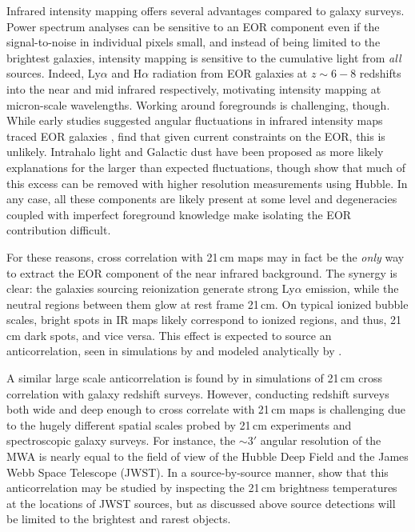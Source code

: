 \documentclass[numberedappendix]{emulateapj}
\begin{document}
Infrared intensity mapping offers several advantages compared to galaxy surveys. Power spectrum analyses can be sensitive to an EOR component even if the signal-to-noise in individual pixels small, and instead of being limited to the brightest galaxies, intensity mapping is sensitive to the cumulative light from \textit{all} sources. Indeed, Ly$\alpha$ and H$\alpha$ radiation from EOR galaxies at $z\sim6-8$ redshifts into the near and mid infrared respectively, motivating intensity mapping at micron-scale wavelengths. Working around foregrounds is challenging, though. While early studies suggested angular fluctuations in infrared intensity maps traced EOR galaxies \citep[e.g.,][]{kash1,kash2,kash3}, \citet{kash4} find that given current constraints on the EOR, this is unlikely. Intrahalo light \citet{cooray12,zemcov14} and Galactic dust \citet{yue16} have been proposed as more likely explanations for the larger than expected fluctuations, though \citet{mw15} show that much of this excess can be removed with higher resolution measurements using Hubble. In any case, all these components are likely present at some level and degeneracies coupled with imperfect foreground knowledge make isolating the EOR contribution difficult.

For these reasons, cross correlation with 21\,cm maps may in fact be the \textit{only} way to extract the EOR component of the near infrared background. The synergy is clear: the galaxies sourcing reionization generate strong Ly$\alpha$ emission, while the neutral regions between them glow at rest frame 21\,cm. On typical ionized bubble scales, bright spots in IR maps likely correspond to ionized regions, and thus, 21\,cm dark spots, and vice versa. This effect is expected to source an anticorrelation, seen in simulations by \citet{silva12,Heneka2016} and modeled analytically by \citet{feng17,mao14}.

A similar large scale anticorrelation is found by \citet{lidz09,park14} in simulations of 21\,cm cross correlation with galaxy redshift surveys. However, conducting redshift surveys both wide and deep enough to cross correlate with 21\,cm maps is challenging due to the hugely different spatial scales probed by 21\,cm experiments and spectroscopic galaxy surveys. For instance, the $\sim3'$ angular resolution of the MWA is nearly equal to the field of view of the Hubble Deep Field and the James Webb Space Telescope (JWST). In a source-by-source manner, \citep{beardsley15} show that this anticorrelation may be studied by inspecting the 21\,cm brightness temperatures at the locations of JWST sources, but as discussed above source detections will be limited to the brightest and rarest objects.
\end{document}
